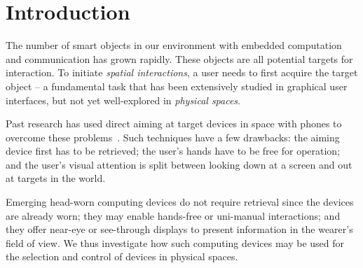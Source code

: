 \vfill
\section{Introduction}

The number of smart objects in our environment with embedded computation and communication has grown rapidly. These objects are all potential targets for interaction. To initiate {\em spatial interactions}, a user needs to first acquire the target object -- a fundamental task that has been extensively studied in graphical user interfaces, but not yet well-explored in {\em physical spaces}.

%
%
Past research has used direct aiming at target devices in space with phones to overcome these problems~\cite{beigl_point_1999,patel_2-way_2003}. Such techniques have a few drawbacks: the aiming device first has to be retrieved; the user's hands have to be free for operation; and the user's visual attention is split between looking down at a screen and out at targets in the world. 

Emerging head-worn computing devices do not require retrieval since the devices are already worn; they may enable hands-free or uni-manual interactions; and they offer near-eye or see-through displays to present information in the wearer's field of view. We thus investigate how such computing devices may be used for the selection and control of devices in physical spaces.

